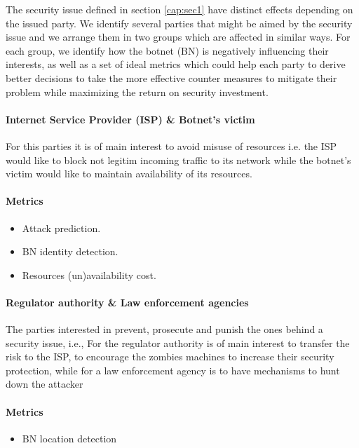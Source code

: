 
The security issue defined in section \ref{cap:sec1} have distinct effects depending on the issued party. We identify several parties that might be aimed by the security issue and we arrange them in two groups which are affected in similar ways. For each group, we identify how the botnet (BN) is negatively influencing their interests, as well as a set of ideal metrics which could help each party to derive better decisions to take the more effective counter measures to mitigate their problem while maximizing the return on security investment.

\indent
\paragraph{Internet Service Provider (ISP) \& Botnet's victim}
For this parties it is of main interest to avoid misuse of resources i.e. the ISP would like to block not legitim incoming traffic to its network while the botnet's victim would like to maintain availability of its resources.
\paragraph{Metrics}
\begin{itemize}
    \item Attack prediction.
    \item BN identity detection.
    \item Resources (un)availability cost.
\end{itemize}
\indent
\indent
\paragraph{Regulator authority \& Law enforcement agencies}
The parties interested in prevent, prosecute and punish the ones behind a security issue, i.e., For the regulator authority is of main interest to transfer the risk to the ISP, to encourage the zombies machines to increase their security protection, while for a law enforcement agency is to have mechanisms to hunt down the attacker
\paragraph{Metrics}
\begin{itemize}
    \item BN location detection
\end{itemize}


